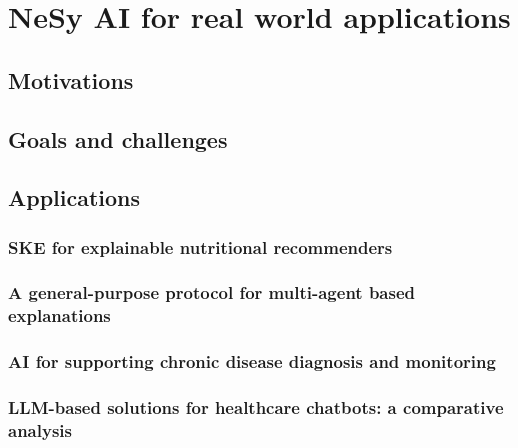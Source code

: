 
\chapter{NeSy AI for real world applications}
\label{ch:nesy-ai-for-real-world-applications}
\minitoc

\section{Motivations}\label{sec:nesy-ai-motivations}

\section{Goals and challenges}\label{sec:nesy-ai-goals-and-challenges}

\section{Applications}\label{sec:nesy-ai-applications}

\subsection{\Gls{SKE} for explainable nutritional recommenders}\label{subsec:ske-for-explainable-nutritional-recommenders}

\subsection{A general-purpose protocol for multi-agent based explanations}\label{subsec:a-general-purpose-protocol-for-multi-agent-based-explanations}

\subsection{ \Gls{AI} for supporting chronic disease diagnosis and monitoring}\label{subsec:nesy-ai-for-supporting-chronic-disease-diagnosis-and-monitoring}

\subsection{\Gls{LLM}-based solutions for healthcare chatbots: a comparative analysis}\label{subsec:llm-based-solutions-for-healthcare-chatbots-a-comparative-analysis}

